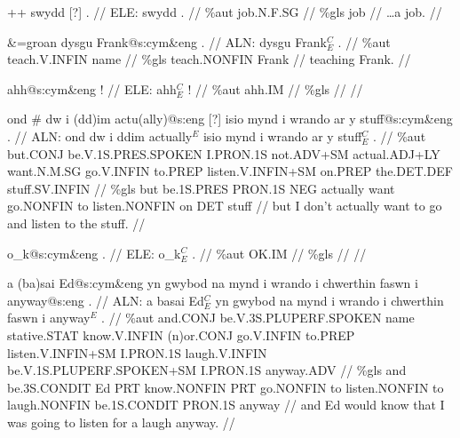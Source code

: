 \documentclass[a4paper,10pt]{article}
\begin{document}
\ex
\begingl[lingstyle=gergl]
\glchat ++ swydd [?] . //
\glsurface ELE:  swydd .  //
\glauto \%aut  job{\scriptsize .N.F.SG}   //
\glmanual \%gls  job   //
\gleng  \dots a job. //
\endgl
\xe

\ex
\begingl[lingstyle=gergl]
\glchat \&=groan dysgu Frank@s:cym\&eng . //
\glsurface ALN:  dysgu Frank$^{C}_{E}$ .  //
\glauto \%aut  teach{\scriptsize .V.INFIN} name   //
\glmanual \%gls  teach{\scriptsize .NONFIN} Frank   //
\gleng teaching Frank. //
\endgl
\xe

\ex
\begingl[lingstyle=gergl]
\glchat ahh@s:cym\&eng ! //
\glsurface ELE:  ahh$^{C}_{E}$ !  //
\glauto \%aut  ahh{\scriptsize .IM}   //
\glmanual \%gls     //
\gleng  //
\endgl
\xe

\ex
\begingl[lingstyle=gergl]
\glchat ond \# dw i (dd)im actu(ally)@s:eng [?] isio mynd i wrando ar y stuff@s:cym\&eng . //
\glsurface ALN:  ond dw i ddim actually$^{E}$ isio mynd i wrando ar y stuff$^{C}_{E}$ .  //
\glauto \%aut  but{\scriptsize .CONJ} be{\scriptsize .V.1S.PRES.SPOKEN} I{\scriptsize .PRON.1S} not{\scriptsize .ADV+SM} actual{\scriptsize .ADJ+LY} want{\scriptsize .N.M.SG} go{\scriptsize .V.INFIN} to{\scriptsize .PREP} listen{\scriptsize .V.INFIN+SM} on{\scriptsize .PREP} the{\scriptsize .DET.DEF} stuff{\scriptsize .SV.INFIN}   //
\glmanual \%gls  but be{\scriptsize .1S.PRES} PRON{\scriptsize .1S} NEG actually want go{\scriptsize .NONFIN} to listen{\scriptsize .NONFIN} on DET stuff   //
\gleng but I don't actually want to go and listen to the stuff. //
\endgl
\xe

\ex
\begingl[lingstyle=gergl]
\glchat o\_k@s:cym\&eng . //
\glsurface ELE:  o\_k$^{C}_{E}$ .  //
\glauto \%aut  OK{\scriptsize .IM}   //
\glmanual \%gls     //
\gleng  //
\endgl
\xe

\ex
\begingl[lingstyle=gergl]
\glchat a (ba)sai Ed@s:cym\&eng yn gwybod na mynd i wrando i chwerthin faswn i anyway@s:eng . //
\glsurface ALN:  a basai Ed$^{C}_{E}$ yn gwybod na mynd i wrando i chwerthin faswn i anyway$^{E}$ .  //
\glauto \%aut  and{\scriptsize .CONJ} be{\scriptsize .V.3S.PLUPERF.SPOKEN} name stative{\scriptsize .STAT} know{\scriptsize .V.INFIN} (n)or{\scriptsize .CONJ} go{\scriptsize .V.INFIN} to{\scriptsize .PREP} listen{\scriptsize .V.INFIN+SM} I{\scriptsize .PRON.1S} laugh{\scriptsize .V.INFIN} be{\scriptsize .V.1S.PLUPERF.SPOKEN+SM} I{\scriptsize .PRON.1S} anyway{\scriptsize .ADV}   //
\glmanual \%gls  and be{\scriptsize .3S.CONDIT} Ed PRT know{\scriptsize .NONFIN} PRT go{\scriptsize .NONFIN} to listen{\scriptsize .NONFIN} to laugh{\scriptsize .NONFIN} be{\scriptsize .1S.CONDIT} PRON{\scriptsize .1S} anyway   //
\gleng and Ed would know that I was going to listen for a laugh anyway. //
\endgl
\xe
\end{document}
